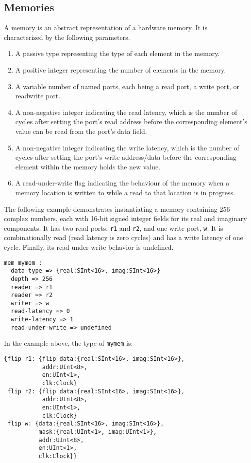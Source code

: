 \documentclass[12pt]{article}
\begin{document}
\subsection{Memories}
A memory is an abstract representation of a hardware memory. It is characterized by the following parameters.
\begin{enumerate}
\item A passive type representing the type of each element in the memory.
\item A positive integer representing the number of elements in the memory.
\item A variable number of named ports, each being a read port, a write port, or readwrite port.
\item A non-negative integer indicating the read latency, which is the number of cycles after setting the port's read address before the corresponding element's value can be read from the port's data field.
\item A non-negative integer indicating the write latency, which is the number of cycles after setting the port's write address/data before the corresponding element within the memory holds the new value.
\item A read-under-write flag indicating the behaviour of the memory when a memory location is written to while a read to that location is in progress.
\end{enumerate}

The following example demonstrates instantiating a memory containing 256 complex numbers, each with 16-bit signed integer fields for its real and imaginary components. It has two read ports, \verb|r1| and \verb|r2|, and one write port, \verb|w|. It is combinationally read (read latency is zero cycles) and has a write latency of one cycle. Finally, its read-under-write behavior is undefined.
\begin{verbatim}
mem mymem :
  data-type => {real:SInt<16>, imag:SInt<16>}
  depth => 256
  reader => r1
  reader => r2
  writer => w
  read-latency => 0
  write-latency => 1
  read-under-write => undefined
\end{verbatim}

In the example above, the type of \verb|mymem| is:
\begin{verbatim}
{flip r1: {flip data:{real:SInt<16>, imag:SInt<16>}, 
           addr:UInt<8>, 
           en:UInt<1>, 
           clk:Clock}
 flip r2: {flip data:{real:SInt<16>, imag:SInt<16>}, 
           addr:UInt<8>, 
           en:UInt<1>, 
           clk:Clock}
 flip w: {data:{real:SInt<16>, imag:SInt<16>}, 
          mask:{real:UInt<1>, imag:UInt<1>}, 
          addr:UInt<8>, 
          en:UInt<1>, 
          clk:Clock}}
\end{verbatim}
\end{document}
